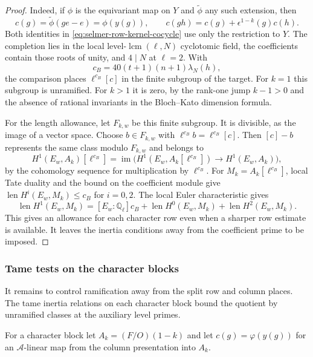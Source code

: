 \begin{proof}
Indeed, if \(\phi\) is the equivariant map on \(Y\) and
\(\widetilde\phi\) any such extension, then
\begin{equation}\label{eq:selmer-row-kernel-cocycle}
 c(g)=\widetilde\phi(ge-e)=\phi(y(g)),\qquad
 c(gh)=c(g)+\epsilon^{1-k}(g)c(h).
\end{equation}
Both identities in \eqref{eq:selmer-row-kernel-cocycle} use only the restriction to \(Y\). The completion lies in
the local level-\(\operatorname{lcm}(\ell,N)\) cyclotomic field,
the coefficients contain those roots of unity, and \(4\mid N\)
at \(\ell=2\). With
\[
 c_B=40(t+1)(n+1)\lambda_N(h),
\]
the
comparison places \(\ell^{c_B}[c]\) in the finite subgroup of
the target. For \(k=1\) this subgroup is unramified. For \(k>1\)
it is zero, by the rank-one jump \(k-1>0\) and the absence of
rational invariants in the Bloch--Kato dimension formula.
\cite{bloch-kato}\label{cor:split-selmer-5}

For the length allowance, let \(F_{k,w}\) be this finite
subgroup. It is divisible, as the image of a vector space.
Choose \(b\in F_{k,w}\) with \(\ell^{c_B}b=\ell^{c_B}[c]\).
Then \([c]-b\) represents the same class modulo \(F_{k,w}\) and
belongs to
\[
 H^1(E_w,A_k)[\ell^{c_B}]
   =\operatorname{im}\bigl(H^1(E_w,A_k[\ell^{c_B}])
                          \longrightarrow H^1(E_w,A_k)\bigr),
\]
by the cohomology sequence for multiplication by \(\ell^{c_B}\). For \(M_k=A_k[\ell^{c_B}]\), local Tate duality and the bound on
the coefficient module give \(\operatorname{len}H^i(E_w,M_k)\le c_B\)
for \(i=0,2\). The local Euler characteristic gives
\[
 \operatorname{len}H^1(E_w,M_k)
 = [E_w:\mathbb Q_\ell]c_B+
   \operatorname{len}H^0(E_w,M_k)+\operatorname{len}H^2(E_w,M_k).
\]
This gives an allowance for each character row even when a sharper row estimate is available. It leaves the inertia conditions away from the coefficient prime to be imposed.
\end{proof}
\subsubsection*{Tame tests on the character blocks}

It remains to control ramification away from the split row and column places. The tame inertia relations on each character block bound the quotient by unramified classes at the auxiliary level primes.

For a character block let \(A_k=(F/O)(1-k)\) and let
\(c(g)=\varphi(y(g))\) for an \(\mathcal A\)-linear map
from the column presentation into \(A_k\).

